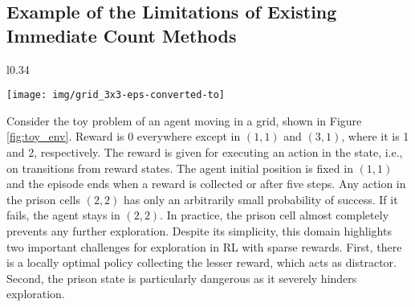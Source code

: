 \documentclass{article}
\begin{document}
\subsection{Example of the Limitations of Existing Immediate Count Methods}
\label{ssec:toy_example}
\begin{wrapfigure}{l}{0.34\textwidth}
	\begin{center}
		\vspace*{-0.7cm}
		\texttt{[image: img/grid\_3x3-eps-converted-to]}
	\end{center}
	\vspace*{-0.5cm}
	\caption{Toy problem domain.}
	\label{fig:toy_env}
	\vspace*{-0.5cm}
\end{wrapfigure}
Consider the toy problem of an agent moving in a grid, shown in Figure \ref{fig:toy_env}. Reward is 0 everywhere except in $(1,1)$ and $(3,1)$, where it is 1 and 2, respectively. The reward is given for executing an action in the state, i.e., on transitions from reward states.
The agent initial position is fixed in $(1,1)$ and the episode ends when a reward is collected or after five steps.
Any action in the prison cells $(2,2)$ has only an arbitrarily small probability of success. If it fails, the agent stays in $(2,2)$. In practice, the prison cell almost completely prevents any further exploration. Despite its simplicity, this domain highlights two important challenges for exploration in RL with sparse rewards. First, there is a locally optimal policy collecting the lesser reward, which acts as distractor. Second, the prison state is particularly dangerous as it severely hinders exploration. 

\medskip
\end{document}
